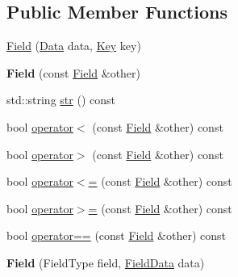 \subsection*{Public Member Functions}
\begin{DoxyCompactItemize}
\item 
\hyperlink{struct_field_a6167eb1c3420a4359f0b5bb541f9be94}{Field} (\hyperlink{union_field_1_1_data}{Data} data, \hyperlink{struct_key}{Key} key)
\item 
\mbox{\label{struct_field_a1222497e50e48b3d2350c3a46dd19db4}} 
{\bfseries Field} (const \hyperlink{struct_field}{Field} \&other)
\item 
std\+::string \hyperlink{struct_field_a75a5e874f066c7877a54e760fdfd4aac}{str} () const
\item 
bool \hyperlink{struct_field_a646b48849ac9d8221aa5f3e57cd8b72f}{operator$<$} (const \hyperlink{struct_field}{Field} \&other) const
\item 
bool \hyperlink{struct_field_a768b337c79d52b58e52340cf546414c0}{operator$>$} (const \hyperlink{struct_field}{Field} \&other) const
\item 
bool \hyperlink{struct_field_a3654ee1d9ec7f5c65eb48c4e37e2e309}{operator$<$=} (const \hyperlink{struct_field}{Field} \&other) const
\item 
bool \hyperlink{struct_field_a6d179b2016926bfd9a9e7785a70038d3}{operator$>$=} (const \hyperlink{struct_field}{Field} \&other) const
\item 
bool \hyperlink{struct_field_a1e63e67061b37ff2539b8f6bc7d5adeb}{operator==} (const \hyperlink{struct_field}{Field} \&other) const
\item 
\mbox{\label{struct_field_a24edcb7adb06501ba8d77adcc695d1f3}} 
{\bfseries Field} (Field\+Type field, \hyperlink{union_field_data}{Field\+Data} data)
\end{DoxyCompactItemize}
